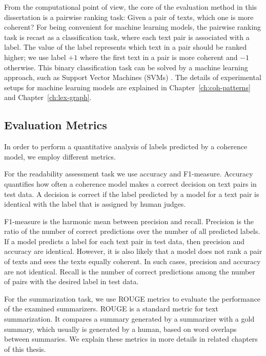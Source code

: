 From the computational point of view, the core of the evaluation method in this dissertation is a pairwise ranking task: Given a pair of texts, which one is more coherent? 
For being convenient for machine learning models, the pairwise ranking task is recast as a classification task, where each text pair is associated with a label. 
The value of the label represents which text in a pair should be ranked higher; we use label $+1$ where the first text in a pair is more coherent and $-1$ otherwise. 
This binary classification task can be solved by a machine learning approach, such as Support Vector Machines (SVMs) \cite{bishop06}.  
The details of experimental setups for machine learning models are explained in Chapter~\ref{ch:coh-patterns} and Chapter~\ref{ch:lex-graph}.  

\subsection{Evaluation Metrics}

In order to perform a quantitative analysis of labels predicted by a coherence model, we employ different metrics.

For the readability assessment task we use accuracy and F1-measure. 
Accuracy quantifies how often a coherence model makes a correct decision on text pairs in test data.
A decision is correct if the label predicted by a model for a text pair is identical with the label that is assigned by human judges.

F1-measure is the harmonic mean between precision and recall. 
Precision is the ratio of the number of correct predictions over the number of all predicted labels. 
If a model predicts a label for each text pair in test data, then precision and accuracy are identical. 
However, it is also likely that a model does not rank a pair of texts and sees the texts equally coherent.  
In such cases, precision and accuracy are not identical.    
Recall is the number of correct predictions among the number of pairs with the desired label in test data. 

For the summarization task, we use ROUGE metrics to evaluate the performance of the examined summarizers. 
ROUGE is a standard metric for text summarization. It compares a summary generated by a summarizer with a gold summary, which usually is generated by a human, based on word overlaps between summaries. 
We explain these metrics in more details in related chapters of this thesis. 


